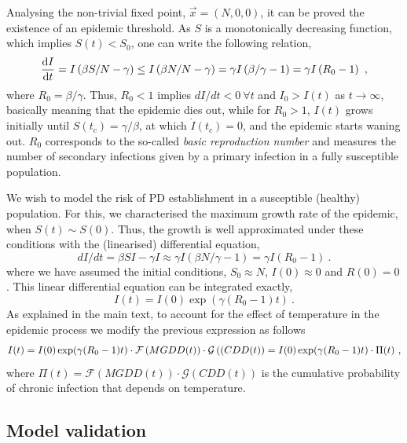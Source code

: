 Analysing the non-trivial fixed point, $\vec{x}=(N, 0, 0)$, it can be
proved the existence of an epidemic threshold. As $S$ is a monotonically
decreasing function, which implies $S(t)<S_0$, one can write the following
relation,
\begin{equation}\label{eq: threshold_t}
    \frac{\mathrm{d} I}{\mathrm{d} t}=I\left(\beta S/N-\gamma\right)\leq I\left(\beta
        N/N-\gamma\right)=\gamma I\left(\beta/\gamma-1\right)=\gamma
    I\left(R_0-1\right) \ ,
\end{equation}
where $R_0= \beta/\gamma$. Thus, $R_0<1$ implies $dI/dt<0 \ \forall t$ and
$I_0>I(t)$ as $t\to\infty$, basically meaning that the epidemic dies out, while
for $R_0>1$, $I(t)$ grows initially until $S(t_c)=\gamma/\beta$, at which
$\dot{I}(t_c)=0$, and the epidemic starts waning out.
$R_0$ corresponds to the so-called \textit{basic reproduction number} and
measures the number of secondary infections given by a primary infection in a
fully susceptible population.

We wish to model the risk of PD establishment in a susceptible (healthy)
population. For this, we characterised the maximum growth rate of the epidemic,
when $S(t)\sim S(0)$. Thus, the growth is well approximated under these
conditions with
the (linearised) differential equation,
\begin{equation}
    dI/dt=\beta SI-\gamma I\approx \gamma I(\beta N/\gamma - 1)=\gamma
    I(R_0-1) \ .
\end{equation}
where we have assumed the initial conditions,
$S_0\approx N$, $I(0)\approx0$ and $R(0)=0$. This linear differential
equation can be integrated exactly,
\begin{equation}\label{eq: infect_proc}
    I(t)=I(0)\exp(\gamma(R_0-1)t) \ .
\end{equation}
As explained in the main text, to account for the effect of temperature in
the epidemic process we modify the previous expression as follows
\begin{equation}\label{eq: final_eq}
    I(t)=I(0)\exp(\gamma(R_0-1)t)\cdot \mathcal{F}\left(MGDD(t)\right)\cdot
    \mathcal{G}\left((CDD(t)\right)= I(0)\exp(\gamma(R_0-1)t)\cdot\Pi(t) \ ,
\end{equation}
where $\Pi(t)=\mathcal{F}(MGDD(t))\cdot \mathcal{G}(CDD(t))$ is the
cumulative probability of chronic infection that depends on temperature.

\subsection{Model validation}

